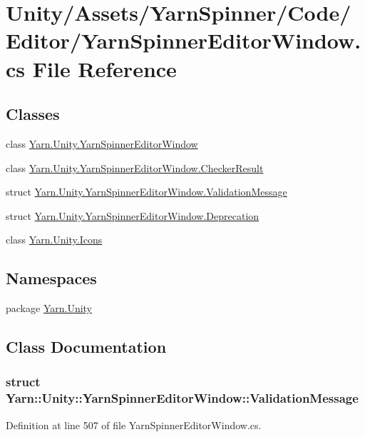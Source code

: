 \hypertarget{a00296}{\section{Unity/\-Assets/\-Yarn\-Spinner/\-Code/\-Editor/\-Yarn\-Spinner\-Editor\-Window.cs File Reference}
\label{a00296}
}
\subsection*{Classes}
\begin{DoxyCompactItemize}
\item 
class \hyperlink{a00188}{Yarn.\-Unity.\-Yarn\-Spinner\-Editor\-Window}
\item 
class \hyperlink{a00051}{Yarn.\-Unity.\-Yarn\-Spinner\-Editor\-Window.\-Checker\-Result}
\item 
struct \hyperlink{a00188_a00386}{Yarn.\-Unity.\-Yarn\-Spinner\-Editor\-Window.\-Validation\-Message}
\item 
struct \hyperlink{a00092}{Yarn.\-Unity.\-Yarn\-Spinner\-Editor\-Window.\-Deprecation}
\item 
class \hyperlink{a00113}{Yarn.\-Unity.\-Icons}
\end{DoxyCompactItemize}
\subsection*{Namespaces}
\begin{DoxyCompactItemize}
\item 
package \hyperlink{a00137}{Yarn.\-Unity}
\end{DoxyCompactItemize}


\subsection{Class Documentation}
\label{a00386}
\hypertarget{a00188_a00386}{}
\subsubsection{struct Yarn\-:\-:Unity\-:\-:Yarn\-Spinner\-Editor\-Window\-:\-:Validation\-Message}


Definition at line 507 of file Yarn\-Spinner\-Editor\-Window.\-cs.



